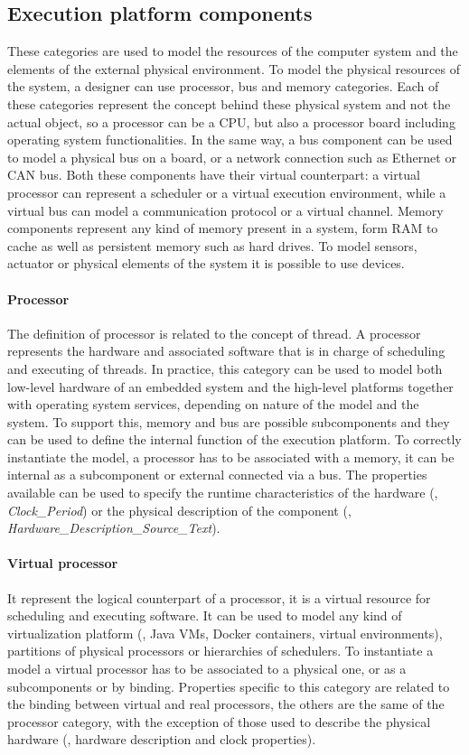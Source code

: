 \subsection{Execution platform components}
These categories are used to model the resources of the computer system and the elements of the external physical environment. To model the physical resources of the system, a designer can use processor,  bus and memory categories. Each of these categories represent the concept behind these physical system and not the actual object, so a processor can be a CPU, but also a processor board including operating system functionalities. In the same way, a bus component can be used to model a physical bus on a board, or a network connection such as Ethernet or CAN bus. Both these components have their virtual counterpart: a virtual processor can represent a scheduler or a virtual execution environment, while a virtual bus can model a communication protocol or a virtual channel. Memory components represent any kind of memory present in a system, form RAM to cache as well as persistent memory such as hard drives. To model sensors, actuator or physical elements of the system it is possible to use devices.

\paragraph{Processor} The definition of processor is related to the concept of thread. A processor represents the hardware and associated software that is in charge of scheduling  and executing of threads. In practice, this category can be used to model both low-level hardware of an embedded system and the high-level platforms together with operating system services, depending on nature of the model and the system. To support this, memory and bus are possible subcomponents and they can be used to define the internal function of the execution platform. To correctly instantiate the model, a processor has to be associated with a memory, it can be internal as a subcomponent or external connected via a bus. The properties available can be used to specify the runtime characteristics of the hardware (\eg, \textit{Clock\_Period}) or the physical description of the component (\eg, \textit{Hardware\_Description\_Source\_Text}).

\paragraph{Virtual processor} It represent the logical counterpart of a processor, it is a virtual resource for scheduling and executing software. It can be used to model any kind of virtualization platform (\eg, Java VMs, Docker containers, virtual environments), partitions of physical processors or hierarchies of schedulers. To instantiate a model a virtual processor has to be associated to a physical one, or as a subcomponents or by binding. Properties specific to this category are related to the binding between virtual and real processors, the others are the same of the processor category, with the exception of those used to describe the physical hardware (\eg, hardware description and clock properties).

